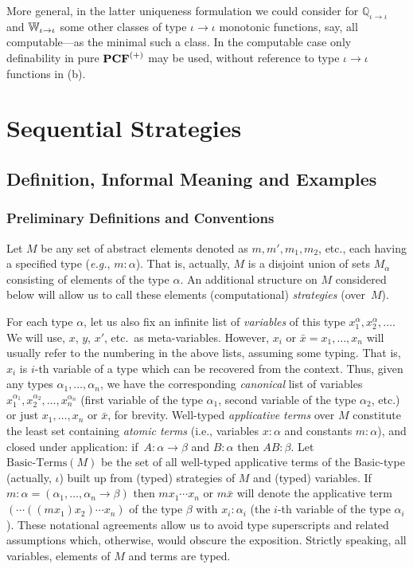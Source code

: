 \documentclass[fleqn]{LMCS}
\theoremstyle{plain}\newtheorem{satz}[thm]{Satz}
\theoremstyle{plain}\newtheorem{hyp}[thm]{Hypothesis}
\theoremstyle{plain}\newtheorem{hyps}[thm]{Hypotheses}
\theoremstyle{definition}\newtheorem{note}[thm]{Note}
\def\eg{{\em e.g.}}
\newcommand{\arr}{\rightarrow}
\newcommand{\bbQ}{\mathbb{Q}}
\newcommand{\PCF}{\mbox{\bf PCF}}
\newcommand{\bx}{\bar{x}}
\newcommand{\?}{\mbox{?}}
\begin{document}
\noindent
More general, in the latter uniqueness formulation 
we could consider for $\bbQ_{\iota\arr\iota}$ and $\bbW_{\iota\arr\iota}$ 
some other classes of type $\iota\arr\iota$ 
monotonic functions, say, all computable---as the minimal such a class. 
In the computable case only definability in pure $\PCF^{(+)}$ may be used, 
without reference to type $\iota\arr\iota$ functions in (b). 

\vspace{1em}


\section{Sequential Strategies}\label{sec-seq-stra}
\subsection{Definition, Informal Meaning and Examples}
\label{sec-seq-stra-def}

\subsubsection{Preliminary Definitions and Conventions}
\label{sec-seq-stra-def-prelim}

\noindent
Let $M$ be any set of abstract elements 
denoted as $m,m',m_1,m_2$, etc., 
each having a specified type (\eg, $m:\alpha$). 
That is, actually, $M$ is a disjoint union of sets $M_{\alpha}$ 
consisting of elements of the type $\alpha$. 
An additional structure on $M$ considered below 
will allow us to call these elements (computational) {\em strategies\/} 
(over~$M$).  


For each type $\alpha$, let us also fix an infinite list of 
\emph{variables} of this type $x_1^{\alpha},x_2^{\alpha},\ldots$. 
We will use, $x$, $y$, $x'$, etc.\ as meta-variables. 
However, 
$x_i$ or $\bx=x_1,\ldots,x_n$ will usually refer 
to the numbering in the above lists, assuming some typing.  
That is, $x_i$ is $i$-th variable of a type which can 
be recovered from the context. 
Thus, given any types $\alpha_1,\ldots,\alpha_n$, 
we have the corresponding \emph{canonical} list 
of variables $x_1^{\alpha_1},x_2^{\alpha_2},\ldots,x_n^{\alpha_n}$ 
(first variable of the type $\alpha_1$, second 
variable of the type $\alpha_2$, etc.) 
or just $x_1,\ldots,x_n$ or $\bx$, for brevity.  
Well-typed \emph{applicative terms} over $M$ constitute the least 
set containing  
\emph{atomic terms} (i.e., variables $x:\alpha$ and constants $m:\alpha$), 
and closed under application: 
if~$A:\alpha\arr\beta$ and $B:\alpha$ then $AB:\beta$. 
Let $\mbox{Basic-Terms}(M)$ be the set of all well-typed applicative 
terms of the \mbox{Basic-type} (actually, $\iota$) built up from 
(typed) strategies of $M$ and (typed) variables. 
If $m:\alpha=(\alpha_1,\ldots,\alpha_n\arr\beta)$ then 
$mx_1\cdots x_n$ or $m\bx$ will denote 
the applicative term $(\cdots((mx_1)x_2)\cdots x_n)$ of the type $\beta$ 
with $x_i:\alpha_i$ (the $i$-th variable of the type $\alpha_i$). 
These notational agreements allow us to avoid 
type superscripts and related assumptions 
which, otherwise, would obscure the exposition. 
Strictly speaking, all variables, elements 
of $M$ and terms are typed. 
\end{document}
